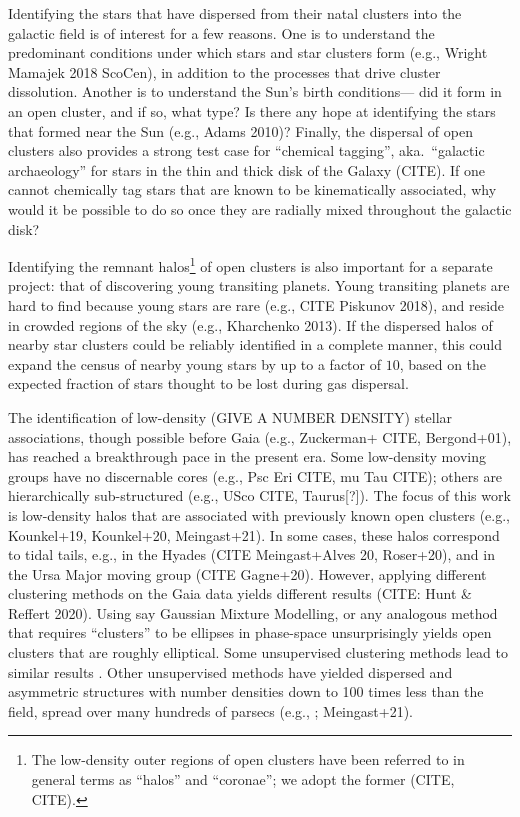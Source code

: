 \documentclass[12pt,twocolumn,tighten]{aastex63}
\begin{document}
Identifying the stars that have dispersed from their natal clusters
into the galactic field is of interest for a few reasons.  One 
is to understand the predominant conditions under which stars and star
clusters form (e.g., Wright Mamajek 2018 ScoCen), in addition to
the processes that drive cluster dissolution.
Another is to understand the Sun's birth conditions---
did it form in an open
cluster, and if so, what type? Is there any hope at
identifying the stars that formed near the Sun (e.g., Adams 2010)?
Finally, the dispersal of open clusters also provides 
a strong test case for ``chemical tagging'', aka.\
``galactic archaeology'' for stars in the thin and thick disk of
the Galaxy (CITE).  If one cannot chemically tag stars
that are known to be kinematically associated, why would 
it be possible to do so once
they are radially mixed throughout the galactic disk?

Identifying the remnant
halos\footnote{ The low-density outer regions of open clusters have
been referred to in general terms as ``halos'' and ``coronae''; we
adopt the former (CITE, CITE). } of open clusters is also important for a
separate project: that of discovering young transiting planets.  Young
transiting planets are hard to find because young stars are rare
(e.g., CITE Piskunov 2018), and reside in crowded regions of the
sky (e.g., Kharchenko 2013).  If the dispersed halos of
nearby star clusters could be reliably identified in a complete
manner, this could expand the census of nearby young stars by up to
a factor of $10$, based on the expected fraction of stars thought to
be lost during gas dispersal.

The identification of low-density (GIVE A NUMBER DENSITY) stellar
associations, though possible before Gaia (e.g.,
Zuckerman+ CITE, Bergond+01), has reached a breakthrough pace in the present era.
Some low-density moving groups have no discernable
cores (e.g., Psc Eri CITE, mu Tau CITE); others are hierarchically
sub-structured (e.g., USco CITE, Taurus[?]).
The focus of this work is
low-density
halos that are associated with previously known open clusters (e.g.,
Kounkel+19, Kounkel+20, Meingast+21).  In some
cases, these halos correspond to tidal tails, e.g., in the Hyades
(CITE Meingast+Alves 20, Roser+20), and in the Ursa Major moving
group (CITE Gagne+20). 
However, applying different clustering methods on the
Gaia data yields different results (CITE: Hunt \& Reffert 2020).
Using say Gaussian Mixture Modelling, or any analogous method that
requires ``clusters'' to be ellipses in phase-space unsurprisingly
yields open clusters that are roughly elliptical.  Some unsupervised
clustering methods lead to similar results \citep[][hereafter
]{cantatgaudin_gaia_2018}.  Other
unsupervised methods
have yielded dispersed and asymmetric structures
with number densities down to 100 times less than the field, spread
over many hundreds of parsecs
(e.g., \citep[][hereafter
]{kounkel_untangling_2019}; Meingast+21).
\end{document}
